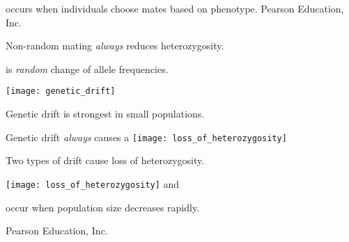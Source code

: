\documentclass[t]{beamer}
\begin{document}
%
{
\begin{frame}[b]{ occurs when individuals choose mates based on phenotype.}
\hfill \tiny \textcopyright Pearson Education, Inc.
\end{frame}
}
%
{
\begin{frame}[b]{Non-random mating \emph{always} reduces heterozygosity.}
\end{frame}
}
%
\begin{frame}[t]{ is \emph{random} change of allele frequencies.}
	\vspace*{-\baselineskip}
	\begin{center}
		\texttt{[image: genetic\_drift]}
	\end{center}

	\vspace*{-\baselineskip}
	
	\hangpara Genetic drift is strongest in small populations.

\end{frame}
{
\begin{frame}{Genetic drift \emph{always} causes a }
	\texttt{[image: loss\_of\_heterozygosity]}
\end{frame}
}
%
{
\begin{frame}{Two types of drift cause  loss of heterozygosity.}

	\begin{multicols}{2}
		\texttt{[image: loss\_of\_heterozygosity]}
	\columnbreak
		\hangpara {} and\\ 
	\end{multicols}
	
\end{frame}
}
%
{
\begin{frame}[b]{ occur when population size decreases rapidly.}

\hfill \tiny \textcopyright Pearson Education, Inc.
\end{frame}
}
%
\end{document}
